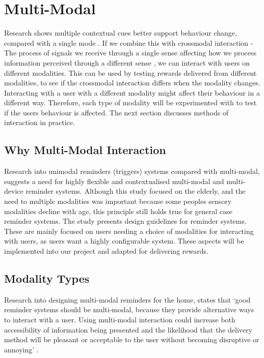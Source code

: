 
\newpage

\section{Multi-Modal}
Research shows multiple contextual cues better support behaviour change, compared with a single mode \cite{article_understanding_use_contextual_cues_design_impl}. If we combine this with crossmodal interaction - The process of signals we receive through a single sense affecting how we process information perceived through a different sense \cite{article_natural_cross_modal_mappings}, we can interact with users on different modalities. This can be used by testing rewards delivered from different modalities, to see if the crossmodal interaction differs when the modality changes.\newline
\newline
Interacting with a user with a different modality might affect their behaviour in a different way. Therefore, each type of modality will be experimented with to test if the users behaviour is affected. The next section discusses methods of interaction in practice.

\subsection{Why Multi-Modal Interaction}
Research \cite{article_user_centred_multimodal_reminders} into unimodal reminders (triggers) systems compared with multi-modal, suggests a need for highly flexible and contextualised multi-modal and multi-device reminder systems. Although this study focused on the elderly, and the need to multiple modalities was important because some peoples sensory modalities decline with age, this principle still holds true for general case reminder systems. The study presents design guidelines for reminder systems. These are mainly focused on users needing a choice of modalities for interacting with users, as users want a highly configurable system. These aspects will be implemented into our project and adapted for delivering rewards.

\subsection{Modality Types}
Research into designing multi-modal reminders for the home, states that `good reminder systems should be multi-modal, because they provide alternative ways to interact with a user. Using multi-modal interaction could increase both accessibility of information being presented and the likelihood that the delivery method will be pleasant or acceptable to the user without becoming disruptive or annoying' \cite{article_designing_multimodal_reminders_for_home}.

